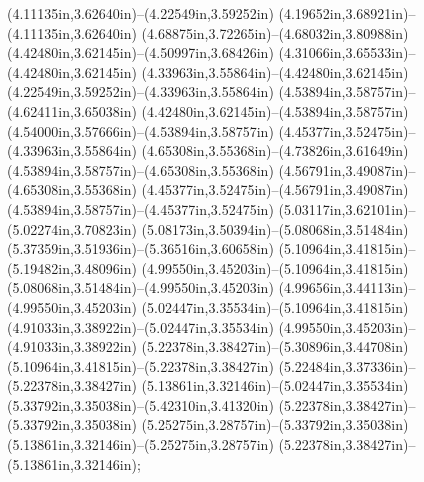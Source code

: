 (4.11135in,3.62640in)--(4.22549in,3.59252in) (4.19652in,3.68921in)--(4.11135in,3.62640in) (4.68875in,3.72265in)--(4.68032in,3.80988in) (4.42480in,3.62145in)--(4.50997in,3.68426in) (4.31066in,3.65533in)--(4.42480in,3.62145in) (4.33963in,3.55864in)--(4.42480in,3.62145in) (4.22549in,3.59252in)--(4.33963in,3.55864in) (4.53894in,3.58757in)--(4.62411in,3.65038in) (4.42480in,3.62145in)--(4.53894in,3.58757in) (4.54000in,3.57666in)--(4.53894in,3.58757in) (4.45377in,3.52475in)--(4.33963in,3.55864in) (4.65308in,3.55368in)--(4.73826in,3.61649in) (4.53894in,3.58757in)--(4.65308in,3.55368in) (4.56791in,3.49087in)--(4.65308in,3.55368in) (4.45377in,3.52475in)--(4.56791in,3.49087in) (4.53894in,3.58757in)--(4.45377in,3.52475in) (5.03117in,3.62101in)--(5.02274in,3.70823in) (5.08173in,3.50394in)--(5.08068in,3.51484in) (5.37359in,3.51936in)--(5.36516in,3.60658in) (5.10964in,3.41815in)--(5.19482in,3.48096in) (4.99550in,3.45203in)--(5.10964in,3.41815in) (5.08068in,3.51484in)--(4.99550in,3.45203in) (4.99656in,3.44113in)--(4.99550in,3.45203in) (5.02447in,3.35534in)--(5.10964in,3.41815in) (4.91033in,3.38922in)--(5.02447in,3.35534in) (4.99550in,3.45203in)--(4.91033in,3.38922in) (5.22378in,3.38427in)--(5.30896in,3.44708in) (5.10964in,3.41815in)--(5.22378in,3.38427in) (5.22484in,3.37336in)--(5.22378in,3.38427in) (5.13861in,3.32146in)--(5.02447in,3.35534in) (5.33792in,3.35038in)--(5.42310in,3.41320in) (5.22378in,3.38427in)--(5.33792in,3.35038in) (5.25275in,3.28757in)--(5.33792in,3.35038in) (5.13861in,3.32146in)--(5.25275in,3.28757in) (5.22378in,3.38427in)--(5.13861in,3.32146in);
